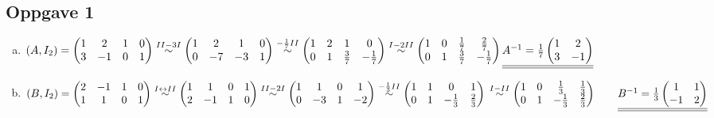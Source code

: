 \documentclass{article}
\newcommand{\vect}[1]{\begin{pmatrix} #1 \end{pmatrix}}
\newcommand{\uu}[1]{\underline{\underline{#1}}}
\newcommand{\eqqto}[1]{\overset{\substack{#1}}{\sim}}
\begin{document}
\subsection*{Oppgave 1}
\begin{enumerate}[a)]
    \item \(
    (A, I_2) = 
    \begin{pmatrix}
        1&2&1&0 \\
        3&-1&0&1
    \end{pmatrix}
    \eqqto{II-3I}
    \begin{pmatrix}
        1&2&1&0 \\
        0&-7&-3&1
    \end{pmatrix}
    \eqqto{-\frac{1}{7}II}
    \begin{pmatrix}
        1&2&1&0 \\
        0&1&\frac{3}{7}&-\frac{1}{7}
    \end{pmatrix}
    \eqqto{I-2II}
    \begin{pmatrix}
        1&0&\frac{1}{7}&\frac{2}{7} \\
        0&1&\frac{3}{7}&-\frac{1}{7}
    \end{pmatrix}
    \\\\\\
    \uu{A^{-1} = \frac{1}{7}\begin{pmatrix}
        1&2\\3&-1
    \end{pmatrix}}
    \)

    \vspace{3em}
    
    \item \(
    (B, I_2) = 
    \begin{pmatrix}
        2&-1&1&0\\
        1&1&0&1
    \end{pmatrix}
    \eqqto{I \leftrightarrow II}
    \begin{pmatrix}
        1&1&0&1\\
        2&-1&1&0
    \end{pmatrix}
    \eqqto{II-2I}
    \begin{pmatrix}
        1&1&0&1\\
        0&-3&1&-2
    \end{pmatrix}
    \eqqto{-\frac{1}{3}II}
    \begin{pmatrix}
        1&1&0&1\\
        0&1&-\frac{1}{3}&\frac{2}{3}
    \end{pmatrix}
    \\\\\\
    \eqqto{I-II}
    \begin{pmatrix}
        1&0&\frac{1}{3}&\frac{1}{3}\\
        0&1&-\frac{1}{3}&\frac{2}{3}
    \end{pmatrix}
    \qquad \uu{B^{-1} = \frac{1}{3}\vect{1&1\\-1&2}}
    \\\\\\\)


\end{enumerate}
\end{document}
